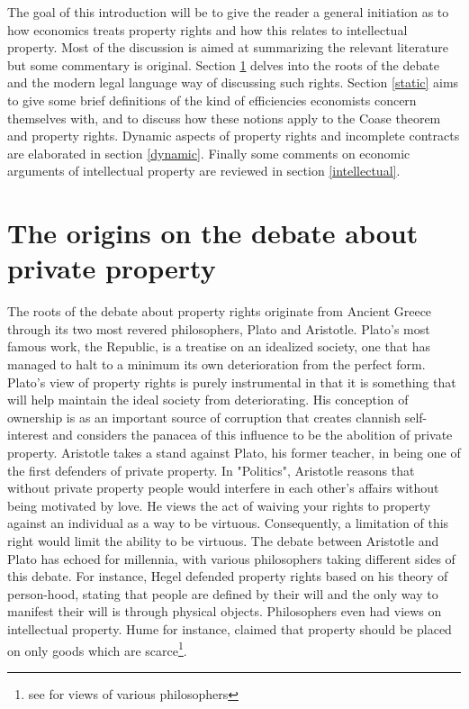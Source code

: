 

The goal of this introduction will be to give the reader a general initiation as to how economics treats property rights and how this relates to intellectual property. Most of the discussion is aimed at summarizing the relevant literature but some commentary is original. Section \ref{origins} delves into the roots of the debate and the modern legal language way of discussing such rights. Section \ref{static} aims to give some brief definitions of the kind of efficiencies economists concern themselves with, and to discuss how these notions apply to the Coase theorem and property rights. Dynamic aspects of property rights and incomplete contracts are elaborated in section \ref{dynamic}. Finally some comments on economic arguments of intellectual property are reviewed in section \ref{intellectual}.

\section{The origins on the debate about private property} \label{origins}

The roots of the debate about property rights originate from Ancient Greece through its two most revered philosophers, Plato and Aristotle. 
Plato's most famous work, the Republic, is a treatise on an idealized society, one that has managed to halt to a minimum its own deterioration from the perfect form. Plato's view of property rights is purely instrumental in that it is something that will help maintain the ideal society from deteriorating. His conception of ownership is as an important source of corruption that creates clannish self-interest and considers the panacea of this influence to be the abolition of private property. Aristotle takes a stand against Plato, his former teacher, in being one of the first defenders of private property. In "Politics",  Aristotle reasons that without private property people would interfere in each other’s affairs without being motivated by love. He views the act of waiving your rights to property against an individual as a way to be virtuous. Consequently, a limitation of this right would limit the ability to be virtuous. The debate between Aristotle and Plato has echoed for millennia, with various philosophers taking different sides of this debate. For instance, Hegel defended property rights based on his theory of person-hood, stating that people are defined by their will and the only way to manifest their will is through physical objects. Philosophers even had views on intellectual property. Hume for instance, claimed that property should be placed on only goods which are scarce\footnote{see \cite{plant1934economic} for views of various philosophers}.

